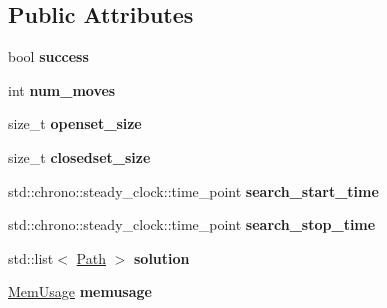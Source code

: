 \subsection*{Public Attributes}
\begin{DoxyCompactItemize}
\item 
\hypertarget{classboxedin_1_1SearchResult_ad906f3ac02a97789d177c462e16362ec}{bool {\bfseries success}}\label{classboxedin_1_1SearchResult_ad906f3ac02a97789d177c462e16362ec}

\item 
\hypertarget{classboxedin_1_1SearchResult_adc5e9f908892b6381ffbe813424843dd}{int {\bfseries num\+\_\+moves}}\label{classboxedin_1_1SearchResult_adc5e9f908892b6381ffbe813424843dd}

\item 
\hypertarget{classboxedin_1_1SearchResult_ad4271e643c769b52895188a62c9f73e4}{size\+\_\+t {\bfseries openset\+\_\+size}}\label{classboxedin_1_1SearchResult_ad4271e643c769b52895188a62c9f73e4}

\item 
\hypertarget{classboxedin_1_1SearchResult_ab9dec2cc9f0238e946c44771d08c3019}{size\+\_\+t {\bfseries closedset\+\_\+size}}\label{classboxedin_1_1SearchResult_ab9dec2cc9f0238e946c44771d08c3019}

\item 
\hypertarget{classboxedin_1_1SearchResult_a2b8fc6d0c94837035a6cba14a919e63c}{std\+::chrono\+::steady\+\_\+clock\+::time\+\_\+point {\bfseries search\+\_\+start\+\_\+time}}\label{classboxedin_1_1SearchResult_a2b8fc6d0c94837035a6cba14a919e63c}

\item 
\hypertarget{classboxedin_1_1SearchResult_aa6080d5ca0060ae85f61459e326772b9}{std\+::chrono\+::steady\+\_\+clock\+::time\+\_\+point {\bfseries search\+\_\+stop\+\_\+time}}\label{classboxedin_1_1SearchResult_aa6080d5ca0060ae85f61459e326772b9}

\item 
\hypertarget{classboxedin_1_1SearchResult_a4793bccb0e11735815f2fb7f4bce5673}{std\+::list$<$ \hyperlink{namespaceboxedin_ab79d3e8d943aa2875e3adb42b8917ff7}{Path} $>$ {\bfseries solution}}\label{classboxedin_1_1SearchResult_a4793bccb0e11735815f2fb7f4bce5673}

\item 
\hypertarget{classboxedin_1_1SearchResult_a6d8dfdbb36641edc4760d2016a861af6}{\hyperlink{structMemUsage}{Mem\+Usage} {\bfseries memusage}}\label{classboxedin_1_1SearchResult_a6d8dfdbb36641edc4760d2016a861af6}

\end{DoxyCompactItemize}
